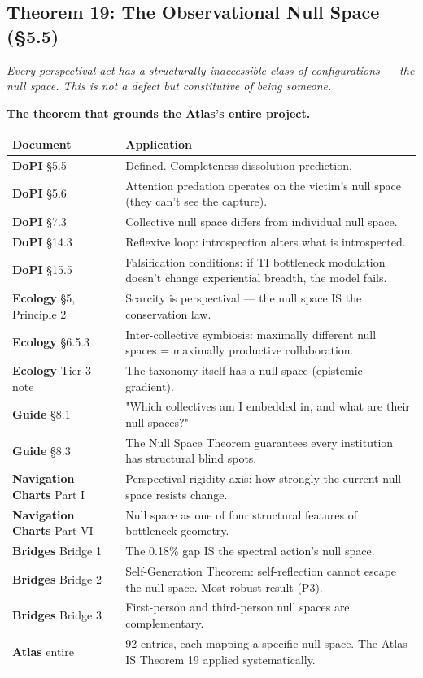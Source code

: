 \subsection*{Theorem 19: The Observational Null Space (§5.5)}


\textit{Every perspectival act has a structurally inaccessible class of configurations — the null space. This is not a defect but constitutive of being someone.}


\textbf{The theorem that grounds the Atlas's entire project.}



\begin{longtable}{p{} p{}}
\toprule
\textbf{Document} & \textbf{Application} \\
\midrule
\endhead
\textbf{DoPI} §5.5 & Defined. Completeness-dissolution prediction. \\
\textbf{DoPI} §5.6 & Attention predation operates on the victim's null space (they can't see the capture). \\
\textbf{DoPI} §7.3 & Collective null space differs from individual null space. \\
\textbf{DoPI} §14.3 & Reflexive loop: introspection alters what is introspected. \\
\textbf{DoPI} §15.5 & Falsification conditions: if TI bottleneck modulation doesn't change experiential breadth, the model fails. \\
\textbf{Ecology} §5, Principle 2 & Scarcity is perspectival — the null space IS the conservation law. \\
\textbf{Ecology} §6.5.3 & Inter-collective symbiosis: maximally different null spaces = maximally productive collaboration. \\
\textbf{Ecology} Tier 3 note & The taxonomy itself has a null space (epistemic gradient). \\
\textbf{Guide} §8.1 & "Which collectives am I embedded in, and what are their null spaces?" \\
\textbf{Guide} §8.3 & The Null Space Theorem guarantees every institution has structural blind spots. \\
\textbf{Navigation Charts} Part I & Perspectival rigidity axis: how strongly the current null space resists change. \\
\textbf{Navigation Charts} Part VI & Null space as one of four structural features of bottleneck geometry. \\
\textbf{Bridges} Bridge 1 & The 0.18\% gap IS the spectral action's null space. \\
\textbf{Bridges} Bridge 2 & Self-Generation Theorem: self-reflection cannot escape the null space. Most robust result (P3). \\
\textbf{Bridges} Bridge 3 & First-person and third-person null spaces are complementary. \\
\textbf{Atlas} entire & 92 entries, each mapping a specific null space. The Atlas IS Theorem 19 applied systematically. \\
\bottomrule
\end{longtable}



